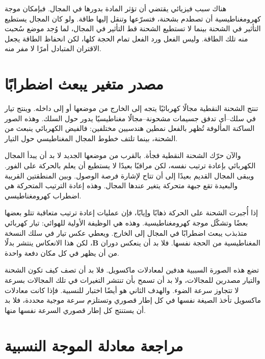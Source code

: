 هناك سبب فيزيائي يقتضي أن تؤثر المادة بدورها في المجال. فبإمكان موجة كهرومغناطيسية أن تصطدم بشحنة، فتسرّعها وتنقل إليها طاقة. ولو كان المجال يستطيع التأثير في الشحنة بينما لا تستطيع الشحنة قط التأثير في المجال، لما وُجد موضع سُحبت منه تلك الطاقة. وليس الفعل ورد الفعل تمام الحجة كلها، لكن انحفاظ الطاقة يجعل الاقتران المتبادل أمرًا لا مفر منه.

\section{مصدر متغير يبعث اضطرابًا}

تنتج الشحنة النقطية مجالًا كهربائيًا يتجه إلى الخارج من موضعها أو إلى داخله. وينتج تيار في سلك--أي تدفق جسيمات مشحونة--مجالًا مغناطيسيًا يدور حول السلك. وهذه الصور الساكنة المألوفة تُظهر بالفعل نمطين هندسيين مختلفين: فالفيض الكهربائي ينبعث من الشحنة، بينما تلتف خطوط المجال المغناطيسي حول التيار.

والآن حرّك الشحنة النقطية فجأة. بالقرب من موضعها الجديد لا بد أن يبدأ المجال الكهربائي بإعادة ترتيب نفسه، لكن مراقبًا بعيدًا لا يستطيع أن يعلم بالحركة على الفور. ويبقى المجال القديم بعيدًا إلى أن تتاح لإشارة فرصة الوصول. وبين المنطقتين القريبة والبعيدة تقع جبهة متحركة يتغير عندها المجال. وهذه إعادة الترتيب المتحركة هي اضطراب كهرومغناطيسي.

إذا أُجبرت الشحنة على الحركة ذهابًا وإيابًا، فإن عمليات إعادة ترتيب متعاقبة تتلو بعضها بعضًا وتشكّل موجة كهرومغناطيسية. وهذه هي الوظيفة الأولية للهوائي: تيار كهربائي متذبذب يبعث اضطرابًا في المجال إلى الخارج. ويعطي عكس تيار في سلك النسخة المغناطيسية من الحجة نفسها. فلا بد أن ينعكس دوران \(\mathbf B\)، لكن هذا الانعكاس ينتشر بدلًا من أن يظهر في كل مكان دفعة واحدة.

تضع هذه الصورة السببية هدفين لمعادلات ماكسويل. فلا بد أن تصف كيف تكون الشحنة والتيار مصدرين للمجالات، ولا بد أن تسمح بأن تنتشر التغيرات في تلك المجالات بسرعة لا تتجاوز سرعة الضوء. والهدف الثاني هو أيضًا اختبار للنسبية. فإذا كانت معادلات ماكسويل تأخذ الصيغة نفسها في كل إطار قصوري وتستلزم سرعة موجية محددة، فلا بد أن يستنتج كل إطار قصوري السرعة نفسها منها.

\section{مراجعة معادلة الموجة النسبية}

